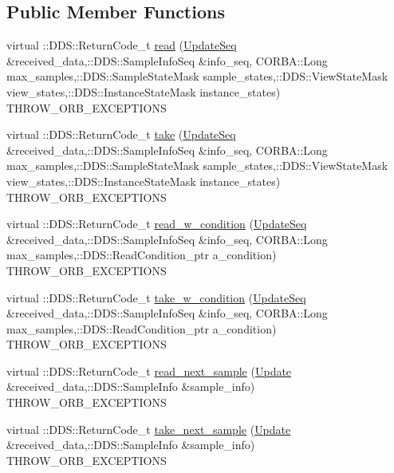\subsection*{Public Member Functions}
\begin{DoxyCompactItemize}
\item 
virtual ::DDS::ReturnCode\_\-t \hyperlink{classKnowledge_1_1UpdateDataReader__impl_a57a5782f4ad3e5aa2fe5d1e1b89d0f53}{read} (\hyperlink{namespaceKnowledge_ab62e46316b954f0d249e0e45de7059dc}{UpdateSeq} \&received\_\-data,::DDS::SampleInfoSeq \&info\_\-seq, CORBA::Long max\_\-samples,::DDS::SampleStateMask sample\_\-states,::DDS::ViewStateMask view\_\-states,::DDS::InstanceStateMask instance\_\-states) THROW\_\-ORB\_\-EXCEPTIONS
\item 
virtual ::DDS::ReturnCode\_\-t \hyperlink{classKnowledge_1_1UpdateDataReader__impl_a172b2c769e18b307db30cb5521f435f8}{take} (\hyperlink{namespaceKnowledge_ab62e46316b954f0d249e0e45de7059dc}{UpdateSeq} \&received\_\-data,::DDS::SampleInfoSeq \&info\_\-seq, CORBA::Long max\_\-samples,::DDS::SampleStateMask sample\_\-states,::DDS::ViewStateMask view\_\-states,::DDS::InstanceStateMask instance\_\-states) THROW\_\-ORB\_\-EXCEPTIONS
\item 
virtual ::DDS::ReturnCode\_\-t \hyperlink{classKnowledge_1_1UpdateDataReader__impl_a65d4b887616c17cb1852a23f64016249}{read\_\-w\_\-condition} (\hyperlink{namespaceKnowledge_ab62e46316b954f0d249e0e45de7059dc}{UpdateSeq} \&received\_\-data,::DDS::SampleInfoSeq \&info\_\-seq, CORBA::Long max\_\-samples,::DDS::ReadCondition\_\-ptr a\_\-condition) THROW\_\-ORB\_\-EXCEPTIONS
\item 
virtual ::DDS::ReturnCode\_\-t \hyperlink{classKnowledge_1_1UpdateDataReader__impl_acd78b7f21eed03c040a7f522a740570a}{take\_\-w\_\-condition} (\hyperlink{namespaceKnowledge_ab62e46316b954f0d249e0e45de7059dc}{UpdateSeq} \&received\_\-data,::DDS::SampleInfoSeq \&info\_\-seq, CORBA::Long max\_\-samples,::DDS::ReadCondition\_\-ptr a\_\-condition) THROW\_\-ORB\_\-EXCEPTIONS
\item 
virtual ::DDS::ReturnCode\_\-t \hyperlink{classKnowledge_1_1UpdateDataReader__impl_abf5bf8534d1535b03496a69b48efa1f1}{read\_\-next\_\-sample} (\hyperlink{structKnowledge_1_1Update}{Update} \&received\_\-data,::DDS::SampleInfo \&sample\_\-info) THROW\_\-ORB\_\-EXCEPTIONS
\item 
virtual ::DDS::ReturnCode\_\-t \hyperlink{classKnowledge_1_1UpdateDataReader__impl_a8970326a07f2e414619ff5bd51733d1c}{take\_\-next\_\-sample} (\hyperlink{structKnowledge_1_1Update}{Update} \&received\_\-data,::DDS::SampleInfo \&sample\_\-info) THROW\_\-ORB\_\-EXCEPTIONS

\end{DoxyCompactItemize}
